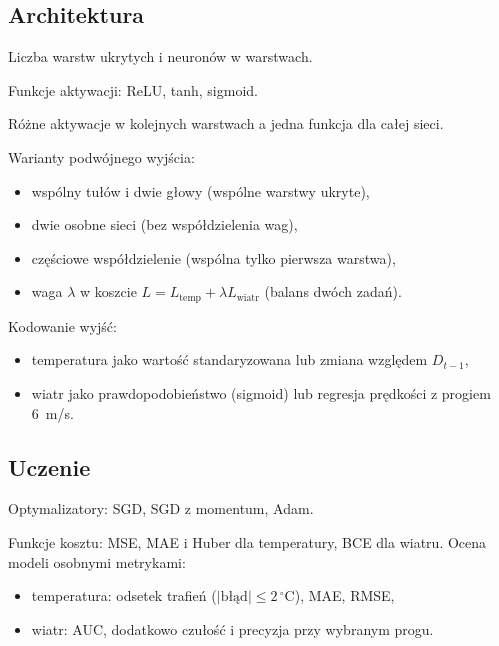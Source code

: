 \documentclass{article}
\begin{document}
\subsection{Architektura}
\begin{badania}
  \item Liczba warstw ukrytych i neuronów w warstwach.
  \item Funkcje aktywacji: ReLU, tanh, sigmoid.
  \item Różne aktywacje w kolejnych warstwach a jedna funkcja dla całej sieci.
  \item Warianty podwójnego wyjścia:
    \begin{itemize}
      \item wspólny tułów i dwie głowy (wspólne warstwy ukryte),
      \item dwie osobne sieci (bez współdzielenia wag),
      \item częściowe współdzielenie (wspólna tylko pierwsza warstwa),
      \item waga $\lambda$ w koszcie $L = L_\text{temp} + \lambda L_\text{wiatr}$ (balans dwóch zadań).
    \end{itemize}
  \item Kodowanie wyjść:
    \begin{itemize}
      \item temperatura jako wartość standaryzowana lub zmiana względem $D_{t-1}$,
      \item wiatr jako prawdopodobieństwo (sigmoid) lub regresja prędkości z progiem 6~m/s.
    \end{itemize}
\end{badania}

\subsection{Uczenie}
\begin{badania}
  \item Optymalizatory: SGD, SGD z momentum, Adam.
  \item Funkcje kosztu: MSE, MAE i Huber dla temperatury, BCE dla wiatru.
    Ocena modeli osobnymi metrykami:
    \begin{itemize}
      \item temperatura: odsetek trafień ($|\text{błąd}| \le 2\,^\circ$C), MAE, RMSE,
      \item wiatr: AUC, dodatkowo czułość i precyzja przy wybranym progu.
    \end{itemize}
\end{badania}
\end{document}
